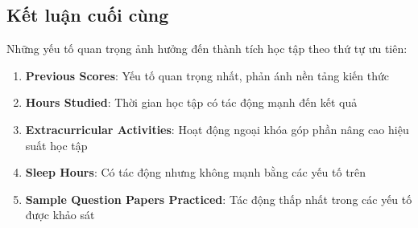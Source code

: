 \subsection{Kết luận cuối cùng}
Những yếu tố quan trọng ảnh hưởng đến thành tích học tập theo thứ tự ưu tiên:
\begin{enumerate}
	\item \textbf{Previous Scores}: Yếu tố quan trọng nhất, phản ánh nền tảng kiến thức
	\item \textbf{Hours Studied}: Thời gian học tập có tác động mạnh đến kết quả
	\item \textbf{Extracurricular Activities}: Hoạt động ngoại khóa góp phần nâng cao hiệu suất học tập
	\item \textbf{Sleep Hours}: Có tác động nhưng không mạnh bằng các yếu tố trên
	\item \textbf{Sample Question Papers Practiced}: Tác động thấp nhất trong các yếu tố được khảo sát
\end{enumerate}



